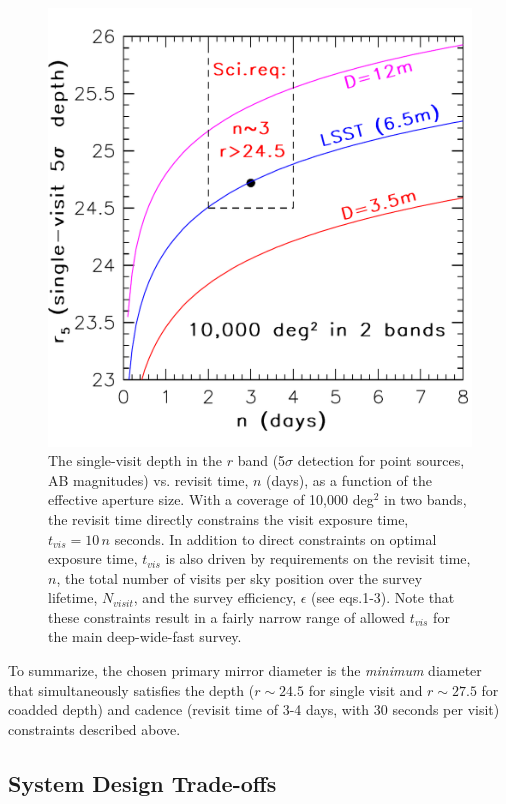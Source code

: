 \begin{figure}[t]
\includegraphics[width=1.0\hsize,clip]{singleDepth.pdf}
\caption{The single-visit depth in the $r$ band (5$\sigma$ detection for
point sources, AB magnitudes) vs. revisit time, $n$ (days), as a function of
the effective aperture size. With a coverage of 10,000 deg$^2$ in two bands,
the revisit time directly constrains the visit exposure time, $t_{vis}=10\,n$
seconds. In addition to direct constraints on optimal exposure time, $t_{vis}$
is also driven by requirements on the revisit time, $n$, the total number of visits
per sky position over the survey lifetime, $N_{visit}$, and the survey efficiency,
$\epsilon$ (see eqs.1-3). Note that these constraints result in a fairly narrow range of
allowed $t_{vis}$ for the main deep-wide-fast survey.}
\label{Fig:singleDepth}
\end{figure}

To summarize, the chosen primary mirror diameter is the {\it minimum}
diameter that simultaneously satisfies the depth ($r\sim24.5$ for single visit and
$r\sim27.5$ for coadded depth) and cadence (revisit time of 3-4 days,
with 30 seconds per visit) constraints described above.

\subsection{System Design Trade-offs}

